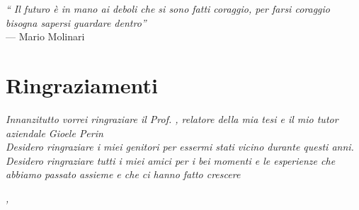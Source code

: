 \cleardoublepage
{}
{}

\begin{flushright}{
    \slshape
    ``
    Il futuro è in mano ai deboli che si sono fatti coraggio, per farsi coraggio bisogna sapersi guardare dentro''} \\
    \medskip
    --- Mario Molinari
\end{flushright}


\bigskip

\begingroup
\let\clearpage\relax
\let\cleardoublepage\relax
\let\cleardoublepage\relax

\chapter*{Ringraziamenti}

\noindent \textit{Innanzitutto vorrei ringraziare il Prof. \myProf, relatore della mia tesi e il mio tutor aziendale Gioele Perin}\\

\noindent \textit{Desidero ringraziare i miei genitori per essermi stati vicino durante questi anni.}\\

\noindent \textit{Desidero ringraziare tutti i miei amici per i bei momenti e le esperienze che abbiamo passato assieme e che ci hanno fatto crescere}\\

\bigskip

\noindent\textit{\myLocation, \myTime}
\hfill \myName

\endgroup
